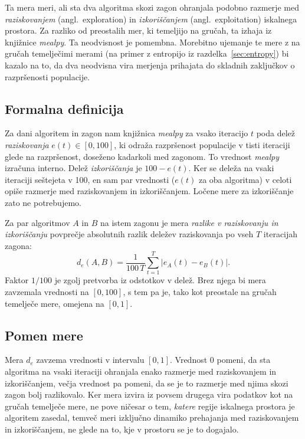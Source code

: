 \documentclass[a4paper, 12pt]{book}
\begin{document}
Ta mera meri, ali sta dva algoritma skozi zagon ohranjala podobno razmerje
med \emph{raziskovanjem} (angl.\ exploration) in \emph{izkoriščanjem} (angl.\
exploitation) iskalnega prostora. Za razliko od preostalih mer, ki temeljijo 
na gručah, ta izhaja iz knjižnice \emph{mealpy}. Ta neodvisnost je pomembna. Morebitno ujemanje te mere z na gručah temelječimi merami (na
primer z entropijo iz razdelka~\ref{sec:entropy}) bi kazalo na to, da dva
neodvisna vira merjenja prihajata do skladnih zaključkov o razpršenosti
populacije.

\subsection{Formalna definicija}
 
Za dani algoritem in zagon nam knjižnica \emph{mealpy} za vsako iteracijo $t$ poda
delež \emph{raziskovanja} $e(t) \in [0, 100]$, ki odraža razpršenost
populacije v tisti iteraciji glede na razpršenost, doseženo  kadarkoli med
zagonom. To vrednost \emph{mealpy} izračuna interno. Delež
\emph{izkoriščanja} je $100 - e(t)$. Ker se deleža na vsaki
iteraciji seštejeta v 100, en sam par vrednosti ($e(t)$ za oba algoritma) v
celoti opiše razmerje med raziskovanjem in izkoriščanjem. Ločene mere za
izkoriščanje zato ne potrebujemo.
 
Za par algoritmov $A$ in $B$ na istem zagonu je mera \emph{razlike v
raziskovanju in izkoriščanju} povprečje absolutnih razlik deležev
raziskovanja po vseh $T$ iteracijah zagona:
\[
    d_e(A, B) = \frac{1}{100\,T} \sum_{t=1}^{T} \left| e_A(t) - e_B(t) \right|.
\]
Faktor $1/100$ je zgolj pretvorba iz odstotkov v delež. Brez njega bi mera
zavzemala vrednosti na $[0,100]$, s tem pa je, tako kot preostale na gručah
temelječe mere, omejena na $[0,1]$.
 
\subsection{Pomen mere}
 
Mera $d_e$ zavzema vrednosti v intervalu $[0, 1]$. Vrednost
0 pomeni, da sta algoritma na vsaki iteraciji ohranjala enako razmerje med
raziskovanjem in izkoriščanjem, večja vrednost pa pomeni, da se je to
razmerje med njima skozi zagon bolj razlikovalo. 
Ker mera izvira iz povsem drugega vira podatkov kot na gručah temelječe
mere, ne pove ničesar o tem, \emph{katere} regije iskalnega prostora je
algoritem zasedal, temveč meri izključno dinamiko prehajanja med raziskovanjem
in izkoriščanjem, ne glede na to, kje v prostoru se je to dogajalo. 
\end{document}
